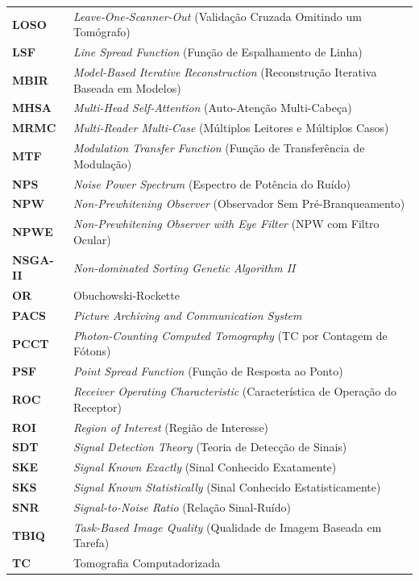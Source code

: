 \documentclass[
  12pt,
  a4paper,
  oneside
]{report}
\begin{document}
\begin{longtable}{ll}
\textbf{LOSO} & \emph{Leave-One-Scanner-Out} (Validação Cruzada Omitindo um Tomógrafo) \\
\textbf{LSF} & \emph{Line Spread Function} (Função de Espalhamento de Linha) \\
\textbf{MBIR} & \emph{Model-Based Iterative Reconstruction} (Reconstrução Iterativa Baseada em Modelos) \\
\textbf{MHSA} & \emph{Multi-Head Self-Attention} (Auto-Atenção Multi-Cabeça) \\
\textbf{MRMC} & \emph{Multi-Reader Multi-Case} (Múltiplos Leitores e Múltiplos Casos) \\
\textbf{MTF} & \emph{Modulation Transfer Function} (Função de Transferência de Modulação) \\
\textbf{NPS} & \emph{Noise Power Spectrum} (Espectro de Potência do Ruído) \\
\textbf{NPW} & \emph{Non-Prewhitening Observer} (Observador Sem Pré-Branqueamento) \\
\textbf{NPWE} & \emph{Non-Prewhitening Observer with Eye Filter} (NPW com Filtro Ocular) \\
\textbf{NSGA-II} & \emph{Non-dominated Sorting Genetic Algorithm II} \\
\textbf{OR} & Obuchowski-Rockette \\
\textbf{PACS} & \emph{Picture Archiving and Communication System} \\
\textbf{PCCT} & \emph{Photon-Counting Computed Tomography} (TC por Contagem de Fótons) \\
\textbf{PSF} & \emph{Point Spread Function} (Função de Resposta ao Ponto) \\
\textbf{ROC} & \emph{Receiver Operating Characteristic} (Característica de Operação do Receptor) \\
\textbf{ROI} & \emph{Region of Interest} (Região de Interesse) \\
\textbf{SDT} & \emph{Signal Detection Theory} (Teoria de Detecção de Sinais) \\
\textbf{SKE} & \emph{Signal Known Exactly} (Sinal Conhecido Exatamente) \\
\textbf{SKS} & \emph{Signal Known Statistically} (Sinal Conhecido Estatisticamente) \\
\textbf{SNR} & \emph{Signal-to-Noise Ratio} (Relação Sinal-Ruído) \\
\textbf{TBIQ} & \emph{Task-Based Image Quality} (Qualidade de Imagem Baseada em Tarefa) \\
\textbf{TC} & Tomografia Computadorizada \\

\end{longtable}
\end{document}
